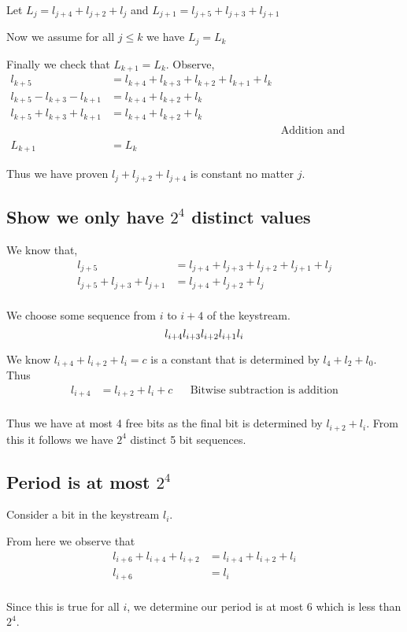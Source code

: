 \documentclass{article}
\begin{document}
Let $L_j = l_{j+4} + l_{j+2} + l_{j}$ and 
$L_{j+1} = l_{j+5} + l_{j+3} + l_{j+1}$

Now we assume for all $j \leq k$ we have $L_j = L_k$

Finally we check that $L_{k+1} = L_k$.
Observe,
\begin{align*}
    l_{k+5} &= l_{k+4} + l_{k+3} + l_{k+2} + l_{k+1} + l_{k} \\
    l_{k+5} - l_{k+3} - l_{k+1} &= l_{k+4} + l_{k+2} + l_{k} \\
    l_{k+5} + l_{k+3} + l_{k+1} &= l_{k+4} + l_{k+2} + l_{k} \\
    && \text{Addition and subtraction are equal in binary} \\
    L_{k+1} &= L_{k}
\end{align*}

Thus we have proven $l_j+l_{j+2}+l_{j+4}$ is constant no matter $j$.

\subsection{Show we only have $2^4$ distinct values}
We know that,
\begin{align*}
    l_{j+5} &= l_{j+4} + l_{j+3} + l_{j+2} + l_{j+1} + l_{j} \\
    l_{j+5} + l_{j+3} + l_{j+1} &= l_{j+4} + l_{j+2} + l_{j} \\
\end{align*}

We choose some sequence from $i$ to $i+4$ of the keystream. 
\begin{equation}
    l_{i+4} l_{i+3} l_{i+2} l_{i+1} l_{i} \\
\end{equation}

We know $l_{i+4} + l_{i+2} + l_{i} = c$ is a constant that is determined by
$l_{4} + l_{2} + l_{0}$. Thus
\begin{align*}
    l_{i+4} &= l_{i+2} + l_{i} + c && \text{Bitwise subtraction is addition} \\
\end{align*}

Thus we have at most 4 free bits as the final bit is determined by
$l_{i+2} + l_{i}$. From this it follows we have $2^4$ distinct 5 bit sequences.

\subsection{Period is at most $2^4$}
Consider a bit in the keystream $l_i$.

From here we observe that
\begin{align*}
    l_{i+6} + l_{i+4} + l_{i+2} &= l_{i+4} + l_{i+2} + l_{i} \\
    l_{i+6} &= l_{i} \\
\end{align*}

Since this is true for all $i$, we determine our period is at most 6 which
is less than $2^4$.
\end{document}
